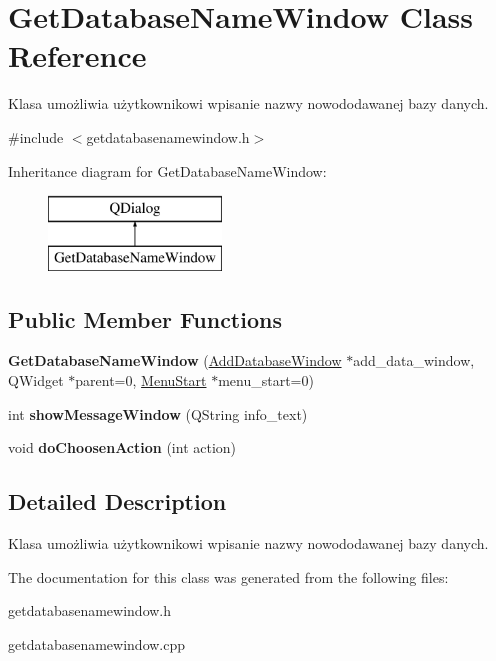 \hypertarget{class_get_database_name_window}{}\section{Get\+Database\+Name\+Window Class Reference}
\label{class_get_database_name_window}


Klasa umożliwia użytkownikowi wpisanie nazwy nowododawanej bazy danych.  




{\ttfamily \#include $<$getdatabasenamewindow.\+h$>$}

Inheritance diagram for Get\+Database\+Name\+Window\+:\begin{figure}[H]
\begin{center}
\leavevmode
\includegraphics[height=2.000000cm]{class_get_database_name_window}
\end{center}
\end{figure}
\subsection*{Public Member Functions}
\begin{DoxyCompactItemize}
\item 
\mbox{\label{class_get_database_name_window_a6d1276a181f974a3c9a899507a6a7485}} 
{\bfseries Get\+Database\+Name\+Window} (\mbox{\hyperlink{class_add_database_window}{Add\+Database\+Window}} $\ast$add\+\_\+data\+\_\+window, Q\+Widget $\ast$parent=0, \mbox{\hyperlink{class_menu_start}{Menu\+Start}} $\ast$menu\+\_\+start=0)
\item 
\mbox{\label{class_get_database_name_window_adcfec27bffb289f06e18e071e6d87e3d}} 
int {\bfseries show\+Message\+Window} (Q\+String info\+\_\+text)
\item 
\mbox{\label{class_get_database_name_window_adca2353140730e90aa481b44de46f94e}} 
void {\bfseries do\+Choosen\+Action} (int action)
\end{DoxyCompactItemize}


\subsection{Detailed Description}
Klasa umożliwia użytkownikowi wpisanie nazwy nowododawanej bazy danych. 

The documentation for this class was generated from the following files\+:\begin{DoxyCompactItemize}
\item 
getdatabasenamewindow.\+h\item 
getdatabasenamewindow.\+cpp\end{DoxyCompactItemize}
